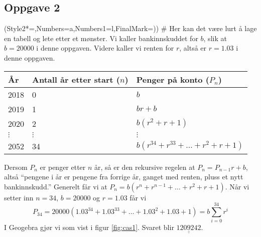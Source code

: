 \documentclass[12pt, a4paper]
{article}						%
\def\answer#1{\underline{\underline{#1}}}
\begin{document}
\subsection*{Oppgave 2}
\begin{easylist}[enumerate]
	\ListProperties(Style2*=,Numbers=a,Numbers1=l,FinalMark={)})
	# Her kan det være lurt å lage en tabell og lete etter et mønster.
	Vi kaller bankinnskuddet for $b$, slik at $b = 20000$ i denne oppgaven.
	Videre kaller vi renten for $r$, altså er $r = 1.03$ i denne oppgaven.
	\begin{center}
		\begin{tabular}{lll}
			\textbf{År} & \textbf{Antall år etter start} ($n$) & \textbf{Penger på konto} ($P_n$) \\ \hline
			2018 & 0 & $b$ \\
			2019 & 1 & $br + b$ \\
			2020 & 2 & $b(r^2 + r + 1)$ \\
			$\vdots$ & $\vdots$ & $\vdots$ \\
			2052 & 34 & $b \left(r^{34} + r^{33} + \dots + r^2 + r + 1\right)$
		\end{tabular}
	\end{center}
	

	Dersom $P_n$ er penger etter $n$ år, så er den rekursive regelen
	at $P_n = P_{n-1}r + b$, altså ``pengene i år er pengene fra forrige år, ganget med renten, pluss et nytt bankinnskudd.''
	Generelt får vi at $P_n = b \left(r^{n} + r^{n-1} + \dots + r^2 + r + 1\right)$.
	Når vi setter inn $n = 34$, $b = 20000$ og $r = 1.03$ får vi
	\begin{equation*}
		P_{34} = 20000 \left(1.03^{34} + 1.03^{33} + \dots + 1.03^2 + 1.03 + 1\right) = b \sum_{i=0}^{34} r^i
	\end{equation*}
	I Geogebra gjør vi som vist i figur \ref{fig:cas1}. Svaret blir $\answer{1209242}$.
	

\end{easylist}
\end{document}
